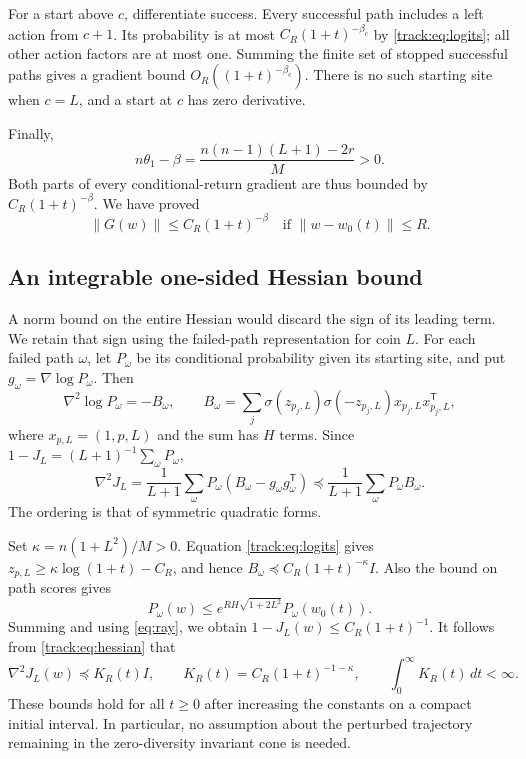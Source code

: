 \documentclass[11pt]{article}
\begin{document}
For a start above $c$, differentiate success. Every successful path includes
a left action from $c+1$. Its probability is at most
$C_R(1+t)^{-\beta_c}$ by \eqref{track:eq:logits}; all other action factors are
at most one. Summing the finite set of stopped successful paths gives a
gradient bound $O_R((1+t)^{-\beta_c})$. There is no such starting site
when $c=L$, and a start at $c$ has zero derivative.

Finally,
\[
 n\theta_1-\beta
 =\frac{n(n-1)(L+1)-2r}{M}>0.
\]
Both parts of every conditional-return gradient are thus bounded by
$C_R(1+t)^{-\beta}$. We have proved
\begin{equation}\label{track:eq:Gbound}
 \|G(w)\|\le C_R(1+t)^{-\beta}\quad\text{if }\|w-w_0(t)\|\le R.
\end{equation}

\subsection{An integrable one-sided Hessian bound}
A norm bound on the entire Hessian would discard the sign of its leading
term. We retain that sign using the failed-path representation for coin $L$.
For each failed path $\omega$, let $P_\omega$ be its conditional probability
given its starting site, and put $g_\omega=\nabla\log P_\omega$. Then
\[
 \nabla^2\log P_\omega=-B_\omega,\qquad
 B_\omega=\sum_{j}\sigma(z_{p_j,L})\sigma(-z_{p_j,L})
 x_{p_j,L}x_{p_j,L}^{\mathsf T},
\]
where $x_{p,L}=(1,p,L)$ and the sum has $H$ terms. Since
$1-J_L=(L+1)^{-1}\sum_\omega P_\omega$,
\begin{equation}\label{track:eq:hessian}
 \nabla^2 J_L
 =\frac1{L+1}\sum_\omega P_\omega
 (B_\omega-g_\omega g_\omega^{\mathsf T})
 \preceq\frac1{L+1}\sum_\omega P_\omega B_\omega.
\end{equation}
The ordering is that of symmetric quadratic forms.

Set $\kappa=n(1+L^2)/M>0$. Equation \eqref{track:eq:logits} gives
$z_{p,L}\ge\kappa\log(1+t)-C_R$, and hence
$B_\omega\preceq C_R(1+t)^{-\kappa}I$.
Also the bound on path scores gives
\[
 P_\omega(w)\le
 e^{RH\sqrt{1+2L^2}}P_\omega(w_0(t)).
\]
Summing and using \eqref{eq:ray}, we obtain
$1-J_L(w)\le C_R(1+t)^{-1}$.
It follows from \eqref{track:eq:hessian} that
\begin{equation}\label{track:eq:onesided}
 \nabla^2J_L(w)\preceq K_R(t)I,\qquad
 K_R(t)=C_R(1+t)^{-1-\kappa},\qquad
 \int_0^\infty K_R(t)\,dt<\infty.
\end{equation}
These bounds hold for all $t\ge0$ after increasing the constants on a
compact initial interval. In particular, no assumption about the perturbed
trajectory remaining in the zero-diversity invariant cone is needed.
\end{document}
